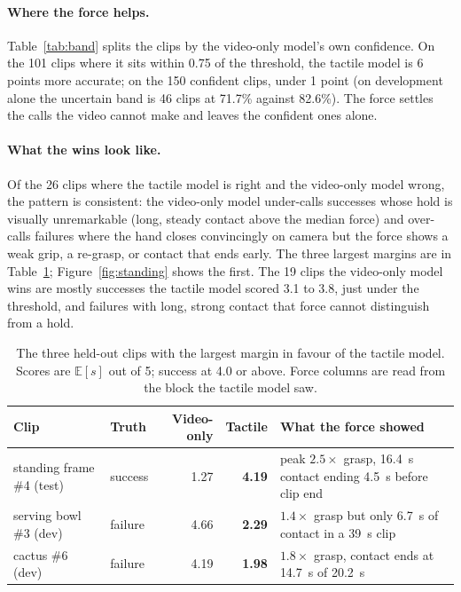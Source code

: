 \documentclass{article}
\newcommand{\Es}{\ensuremath{\mathbb{E}[s]}}
\begin{document}
\paragraph{Where the force helps.} Table~\ref{tab:band} splits the clips by the video-only
model's own confidence. On the 101 clips where it sits within 0.75 of the threshold, the tactile
model is 6 points more accurate; on the 150 confident clips, under 1 point (on development alone
the uncertain band is 46 clips at 71.7\% against 82.6\%). The force settles the calls the video
cannot make and leaves the confident ones alone.

\paragraph{What the wins look like.} Of the 26 clips where the tactile model is right and the
video-only model wrong, the pattern is consistent: the video-only model under-calls successes
whose hold is visually unremarkable (long, steady contact above the median force) and over-calls
failures where the hand closes convincingly on camera but the force shows a weak grip, a
re-grasp, or contact that ends early. The three largest margins are in Table~\ref{tab:wins}; Figure~\ref{fig:standing} shows the
first. The
19 clips the video-only model wins are mostly successes the tactile model scored 3.1 to 3.8, just
under the threshold, and failures with long, strong contact that force cannot distinguish from a
hold.

\begin{table}[t]
  \caption{The three held-out clips with the largest margin in favour of the tactile model.
  Scores are \Es{} out of 5; success at 4.0 or above. Force columns are read from the block the
  tactile model saw.}
  \label{tab:wins}
  \centering
  \footnotesize
  \begin{tabular}{llrrp{5.6cm}}
    \toprule
    Clip & Truth & Video-only & Tactile & What the force showed \\
    \midrule
    standing frame \#4 (test) & success & 1.27 & \textbf{4.19} & peak $2.5\times$ grasp, 16.4~s contact ending 4.5~s before clip end \\
    serving bowl \#3 (dev) & failure & 4.66 & \textbf{2.29} & $1.4\times$ grasp but only 6.7~s of contact in a 39~s clip \\
    cactus \#6 (dev) & failure & 4.19 & \textbf{1.98} & $1.8\times$ grasp, contact ends at 14.7~s of 20.2~s \\
    \bottomrule
  \end{tabular}
\end{table}
\end{document}
